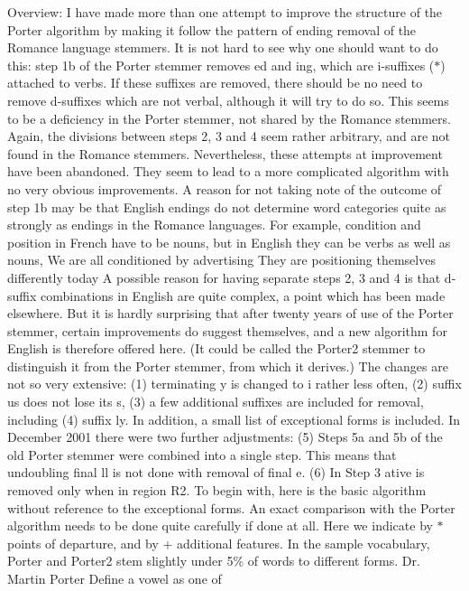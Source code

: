 \begin{DoxyParagraph}{Overview\+:}
I have made more than one attempt to improve the structure of the Porter algorithm by making it follow the pattern of ending removal of the Romance language stemmers. It is not hard to see why one should want to do this\+: step 1b of the Porter stemmer removes ed and ing, which are i-\/suffixes ($\ast$) attached to verbs. If these suffixes are removed, there should be no need to remove d-\/suffixes which are not verbal, although it will try to do so. This seems to be a deficiency in the Porter stemmer, not shared by the Romance stemmers. Again, the divisions between steps 2, 3 and 4 seem rather arbitrary, and are not found in the Romance stemmers. Nevertheless, these attempts at improvement have been abandoned. They seem to lead to a more complicated algorithm with no very obvious improvements. A reason for not taking note of the outcome of step 1b may be that English endings do not determine word categories quite as strongly as endings in the Romance languages. For example, condition and position in French have to be nouns, but in English they can be verbs as well as nouns, We are all conditioned by advertising They are positioning themselves differently today A possible reason for having separate steps 2, 3 and 4 is that d-\/suffix combinations in English are quite complex, a point which has been made elsewhere. But it is hardly surprising that after twenty years of use of the Porter stemmer, certain improvements do suggest themselves, and a new algorithm for English is therefore offered here. (It could be called the \textquotesingle{}Porter2\textquotesingle{} stemmer to distinguish it from the Porter stemmer, from which it derives.) The changes are not so very extensive\+: (1) terminating y is changed to i rather less often, (2) suffix us does not lose its s, (3) a few additional suffixes are included for removal, including (4) suffix ly. In addition, a small list of exceptional forms is included. In December 2001 there were two further adjustments\+: (5) Steps 5a and 5b of the old Porter stemmer were combined into a single step. This means that undoubling final ll is not done with removal of final e. (6) In Step 3 ative is removed only when in region R2. To begin with, here is the basic algorithm without reference to the exceptional forms. An exact comparison with the Porter algorithm needs to be done quite carefully if done at all. Here we indicate by $\ast$ points of departure, and by + additional features. In the sample vocabulary, Porter and Porter2 stem slightly under 5\% of words to different forms. Dr. Martin Porter Define a vowel as one of

\end{DoxyParagraph}
